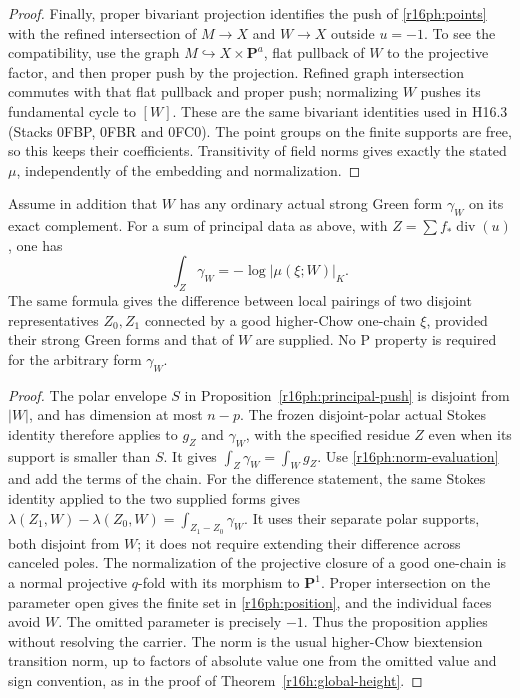 \begin{proof}
Finally, proper bivariant projection identifies the push of
\eqref{r16ph:points} with the refined intersection of $M\to X$
and $W\to X$ outside $u=-1$.  To see the compatibility, use the
graph $M\hookrightarrow X\times\mathbf P^a$, flat pullback
of $W$ to the projective factor, and then proper push by the
projection.  Refined graph intersection commutes with that flat
pullback and proper push; normalizing $W$ pushes its fundamental
cycle to $[W]$.  These are the same bivariant identities used
in H16.3 (Stacks 0FBP, 0FBR and 0FC0).  The point groups on the
finite supports are free, so this keeps their coefficients.
Transitivity of field norms gives exactly the stated $\mu$,
independently of the embedding and normalization.
\end{proof}

\begin{corollary}
\label{r16ph:principal-law}
Assume in addition that $W$ has any ordinary actual strong Green
form $\gamma_W$ on its exact complement.  For a sum of principal
data as above, with $Z=\sum f_*\operatorname{div}(u)$, one has
\[
                   \int_Z\gamma_W
                       =-\log|\mu(\xi;W)|_K.
 \tag{PH16.9}\label{r16ph:principal-law-eq}
\]
The same formula gives the difference between local pairings of
two disjoint representatives $Z_0,Z_1$ connected by a good
higher-Chow one-chain $\xi$, provided their strong Green forms
and that of $W$ are supplied.  No P property is required for
the arbitrary form $\gamma_W$.
\end{corollary}

\begin{proof}
The polar envelope $S$ in Proposition~\ref{r16ph:principal-push}
is disjoint from $|W|$, and has dimension at most $n-p$.
The frozen disjoint-polar actual Stokes identity therefore applies
to $g_Z$ and $\gamma_W$, with the specified residue $Z$ even when
its support is smaller than $S$.  It gives
$\int_Z\gamma_W=\int_W g_Z$.
Use \eqref{r16ph:norm-evaluation} and add the terms of the chain.
For the difference statement, the same Stokes identity applied to
the two supplied forms gives
$\lambda(Z_1,W)-\lambda(Z_0,W)=\int_{Z_1-Z_0}\gamma_W$.
It uses their separate polar supports, both disjoint from $W$;
it does not require extending their difference across canceled
poles.  The normalization of the projective closure of a good
one-chain is a normal projective $q$-fold with its morphism to
$\mathbf P^1$.  Proper intersection on the parameter open
gives the finite set in \eqref{r16ph:position}, and the individual
faces avoid $W$.  The omitted parameter is precisely $-1$.
Thus the proposition applies without resolving the carrier.
The norm is the usual higher-Chow biextension transition norm,
up to factors of absolute value one from the omitted value and
sign convention, as in the proof of Theorem~\ref{r16h:global-height}.
\end{proof}

